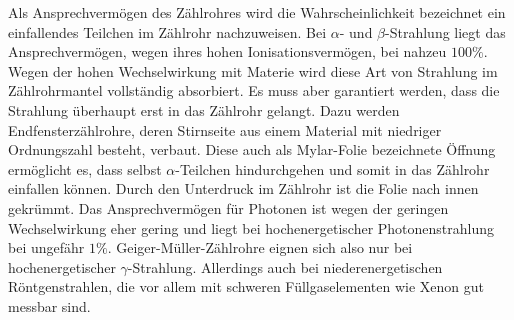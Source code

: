 Als Ansprechvermögen des Zählrohres wird die Wahrscheinlichkeit bezeichnet ein einfallendes Teilchen im Zählrohr nachzuweisen. Bei $\alpha$- und $\beta$-Strahlung liegt das Ansprechvermögen, wegen ihres hohen Ionisationsvermögen, bei nahzeu $100 \%$.
Wegen der hohen Wechselwirkung mit Materie wird diese Art von Strahlung im Zählrohrmantel vollständig absorbiert. Es muss aber garantiert werden, dass die Strahlung überhaupt erst in das Zählrohr gelangt. Dazu werden Endfensterzählrohre, deren Stirnseite aus einem
Material mit niedriger Ordnungszahl besteht, verbaut. Diese auch als Mylar-Folie bezeichnete Öffnung ermöglicht es, dass selbst $\alpha$-Teilchen hindurchgehen und somit in das Zählrohr einfallen können. Durch den Unterdruck im Zählrohr ist die Folie nach innen gekrümmt. \newline
Das Ansprechvermögen für Photonen ist wegen der geringen Wechselwirkung eher gering und liegt bei hochenergetischer Photonenstrahlung bei ungefähr $1 \%$. Geiger-Müller-Zählrohre eignen sich also nur bei hochenergetischer $\gamma$-Strahlung. Allerdings auch bei niederenergetischen Röntgenstrahlen, die vor allem mit schweren Füllgaselementen
wie Xenon gut messbar sind.